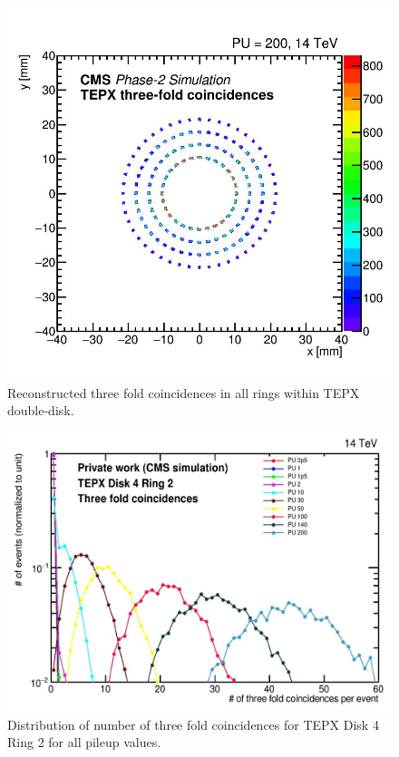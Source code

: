 \begin{figure}[H]
  \centering
  \includegraphics[width=0.8\columnwidth]{ashish_thesis/tepx_threefold_coincidences_1.png}
  \caption[Regions in XY plane showing three-fold coincidences]{Reconstructed three fold coincidences in all rings within TEPX double-disk.}
  \label{fig:tepx_3foldcoin_allPU_1}
\end{figure}

\newpage
\begin{figure}[H]
  \centering
  \includegraphics[width=0.7\columnwidth]{ashish_thesis/tepx_threefold_allpu.png}
  \caption[TEPX Disk 4 Ring 2 Three Fold Coincidences]{Distribution of number of three fold coincidences for TEPX Disk 4 Ring 2 for all pileup values.}
  \label{fig:tepx_3foldcoin_allPU_2}
\end{figure}


